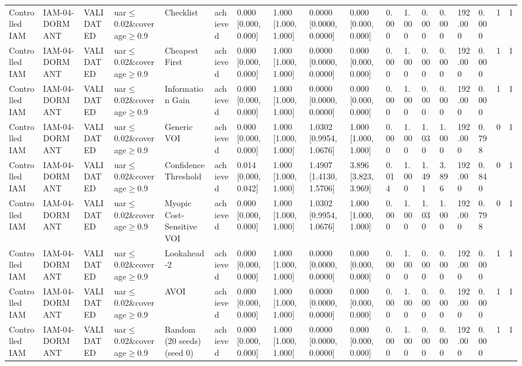\begin{table}[!ht]
{\begin{tabular}{llllllllllllllllll}
Controlled IAM & IAM-04-DORMANT & VALIDATED & uar$\le$0.02\&coverage$\ge$0.9 & Checklist & achieved & 0.000 [0.000, 0.000] & 1.000 [1.000, 1.000] & 0.0000 [0.0000, 0.0000] & 0.000 [0.000, 0.000] & 0.000 & 1.000 & 0.000 & 0.000 & 192.000 & 0.000 & 1 & 1 \\
Controlled IAM & IAM-04-DORMANT & VALIDATED & uar$\le$0.02\&coverage$\ge$0.9 & Cheapest First & achieved & 0.000 [0.000, 0.000] & 1.000 [1.000, 1.000] & 0.0000 [0.0000, 0.0000] & 0.000 [0.000, 0.000] & 0.000 & 1.000 & 0.000 & 0.000 & 192.000 & 0.000 & 1 & 1 \\
Controlled IAM & IAM-04-DORMANT & VALIDATED & uar$\le$0.02\&coverage$\ge$0.9 & Information Gain & achieved & 0.000 [0.000, 0.000] & 1.000 [1.000, 1.000] & 0.0000 [0.0000, 0.0000] & 0.000 [0.000, 0.000] & 0.000 & 1.000 & 0.000 & 0.000 & 192.000 & 0.000 & 1 & 1 \\
Controlled IAM & IAM-04-DORMANT & VALIDATED & uar$\le$0.02\&coverage$\ge$0.9 & Generic VOI & achieved & 0.000 [0.000, 0.000] & 1.000 [1.000, 1.000] & 1.0302 [0.9954, 1.0676] & 1.000 [1.000, 1.000] & 0.000 & 1.000 & 1.030 & 1.000 & 192.000 & 0.798 & 0 & 1 \\
Controlled IAM & IAM-04-DORMANT & VALIDATED & uar$\le$0.02\&coverage$\ge$0.9 & Confidence Threshold & achieved & 0.014 [0.000, 0.042] & 1.000 [1.000, 1.000] & 1.4907 [1.4130, 1.5706] & 3.896 [3.823, 3.969] & 0.014 & 1.000 & 1.491 & 3.896 & 192.000 & 0.840 & 0 & 1 \\
Controlled IAM & IAM-04-DORMANT & VALIDATED & uar$\le$0.02\&coverage$\ge$0.9 & Myopic Cost-Sensitive VOI & achieved & 0.000 [0.000, 0.000] & 1.000 [1.000, 1.000] & 1.0302 [0.9954, 1.0676] & 1.000 [1.000, 1.000] & 0.000 & 1.000 & 1.030 & 1.000 & 192.000 & 0.798 & 0 & 1 \\
Controlled IAM & IAM-04-DORMANT & VALIDATED & uar$\le$0.02\&coverage$\ge$0.9 & Lookahead-2 & achieved & 0.000 [0.000, 0.000] & 1.000 [1.000, 1.000] & 0.0000 [0.0000, 0.0000] & 0.000 [0.000, 0.000] & 0.000 & 1.000 & 0.000 & 0.000 & 192.000 & 0.000 & 1 & 1 \\
Controlled IAM & IAM-04-DORMANT & VALIDATED & uar$\le$0.02\&coverage$\ge$0.9 & AVOI & achieved & 0.000 [0.000, 0.000] & 1.000 [1.000, 1.000] & 0.0000 [0.0000, 0.0000] & 0.000 [0.000, 0.000] & 0.000 & 1.000 & 0.000 & 0.000 & 192.000 & 0.000 & 1 & 1 \\
Controlled IAM & IAM-04-DORMANT & VALIDATED & uar$\le$0.02\&coverage$\ge$0.9 & Random (20 seeds) (seed 0) & achieved & 0.000 [0.000, 0.000] & 1.000 [1.000, 1.000] & 0.0000 [0.0000, 0.0000] & 0.000 [0.000, 0.000] & 0.000 & 1.000 & 0.000 & 0.000 & 192.000 & 0.000 & 1 & 1 \\

\end{tabular}}
\end{table}
